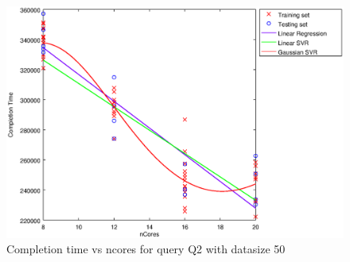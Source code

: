
\begin {figure}[hbtp]
\centering
\includegraphics[width=\textwidth]{output/Q2_50_ONLY_NCORES/plot_Q2_50_bestmodels.eps}
\caption{Completion time vs ncores for query Q2 with datasize 50}
\label{fig:all_linear_Q2_50}
\end {figure}
